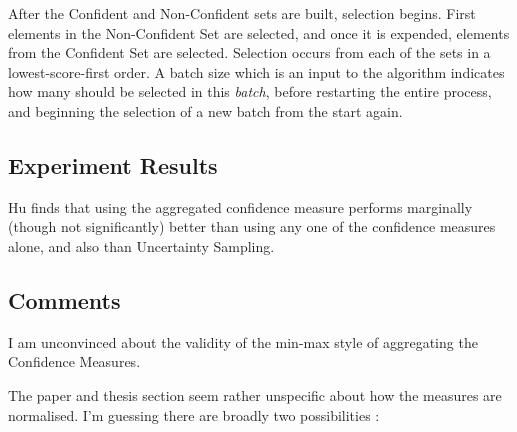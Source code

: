 \documentclass[a4paper,11pt]{report}
\begin{document}
After the Confident and Non-Confident sets are built, selection begins. First elements in the Non-Confident Set are selected, and once it is expended, elements from the Confident Set are selected. Selection occurs from each of the sets in a lowest-score-first order. A batch size which is an input to the algorithm indicates how many should be selected in this \emph{batch}, before restarting the entire process, and beginning the selection of a new batch from the start again.

\subsection{Experiment Results}
Hu finds that using the aggregated confidence measure performs marginally (though not significantly) better than using any one of the confidence measures alone, and also than Uncertainty Sampling.


\subsection{Comments}
I am unconvinced about the validity of the min-max style of aggregating the Confidence Measures.

The paper and thesis section seem rather unspecific about how the measures are normalised. I'm guessing there are broadly two possibilities :
\end{document}
